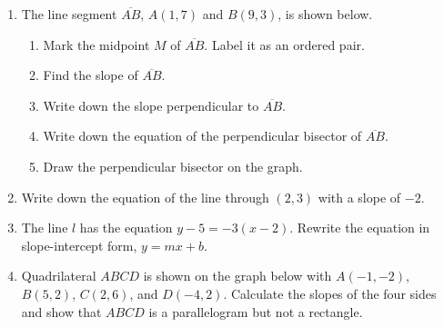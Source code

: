 \documentclass[12pt, twoside]{article}
\begin{document}
\begin{enumerate}
\item The line segment $\overline{AB}$, $A(1,7)$ and $B(9,3)$, is shown below.
  \begin{multicols}{2}
    \begin{enumerate}
    \item Mark the midpoint $M$ of $\overline{AB}$. Label it as an ordered pair.
    \item Find the slope of $\overline{AB}$. \vspace{2cm}
    \item Write down the slope perpendicular to $\overline{AB}$. \vspace{1cm}
    \item Write down the equation of the perpendicular bisector of $\overline{AB}$. \vspace{2cm}
    \item Draw the perpendicular bisector on the graph.
  \end{enumerate} \vspace{1cm}  
  \begin{center} %
    \end{center} 
  \end{multicols}

\newpage
\item Write down the equation of the line through $(2,3)$ with a slope of $-2$.
\vspace{2cm}

\item The line $l$ has the equation $y-5=-3(x-2)$. Rewrite the  equation in slope-intercept form, $y=mx+b$. \vspace{3cm}

\item Quadrilateral $ABCD$ is shown on the graph below with $A(-1,-2)$, $B(5,2)$, $C(2,6)$, and $D(-4,2)$. Calculate the slopes of the four sides and show that $ABCD$ is a parallelogram but not a rectangle.
  \begin{flushright} %
  \end{flushright}

  
\end{enumerate}
\end{document}
